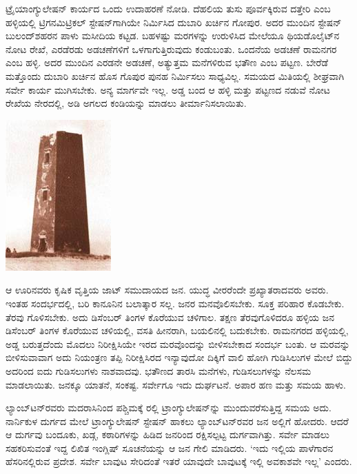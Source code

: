 ಟ್ರೈಯಾಂಗ್ಯುಲೇಷನ್​ ಕಾರ್ಯದ ಒಂದು ಉದಾಹರಣೆ ನೋಡಿ. ದೆಹಲಿಯ ತುಸು ಪೂರ್ವಕ್ಕಿರುವ ದತ್ತೇರಿ ಎಂಬ ಹಳ್ಳಿಯಲ್ಲಿ ಟ್ರಿಗನಮಿಟ್ರಿಕಲ್​ ಸ್ಟೇಷನ್​ಗಾಗಿಯೇ ನಿರ್ಮಿಸಿದ ದುಬಾರಿ ಖರ್ಚಿನ ಗೋಪುರ. ಅದರ ಮುಂದಿನ ಸ್ಟೇಷನ್​ ಬುಲಂದ್​ಶಹರನ ಪಾಳು ಮಸೀದಿಯ ಕಟ್ಟಡ. ಬಹಳಷ್ಟು ಮರಗಳನ್ನು ಉರುಳಿಸಿದ ಮೇಲೆಯೂ ಥಿಯಡೊಲೈಟ್​ನ ನೋಟ ರೇಖೆ, ಎರಡೆರಡು ಅಡಚಣೆಗಳಿಗೆ ಒಳಗಾಗುತ್ತಿರುವುದು ಕಂಡುಬಂತು. ಒಂದನೆಯ ಅಡಚಣೆ ರಾಮನಗರ ಎಂಬ ಹಳ್ಳಿ. ಅದರ ಮುಂದಿನ ಎರಡನೇ ಅಡಚಣೆ, ಅತ್ಯುತ್ತಮ ಮನೆಗಳಿರುವ ಭತೌಣ ಎಂಬ ಪಟ್ಟಣ. ಬೇರೆಡೆ ಮತ್ತೊಂದು ದುಬಾರಿ ಖರ್ಚಿನ ಹೊಸ ಗೊಪುರ ಪುನಹ ನಿರ್ಮಿಸಲು ಸಾಧ್ಯವಿಲ್ಲ. ಸಮಯದ ಮಿತಿಯಲ್ಲಿ ಶೀಘ್ರವಾಗಿ ಸರ್ವೇ ಕಾರ್ಯ ಮುಗಿಸಬೇಕು. ಅನ್ಯ ಮಾರ್ಗವೇ ಇಲ್ಲ. ಅಡ್ಡ ಬಂದ ಆ ಹಳ್ಳಿ ಮತ್ತು ಪಟ್ಟಣದ ನಡುವೆ ನೋಟ ರೇಖೆಯ ನೇರದಲ್ಲಿ,  ಅಡಿ ಅಗಲದ ಕಂಡಿಯನ್ನು ಮಾಡಲು ತೀರ್ಮಾನಿಸಲಾಯಿತು.

\begin{center}
\includegraphics[scale=0.9]{"images/image015.jpg"}
\end{center}

\vskip 4pt

ಆ ಊರಿನವರು ಕೃಷಿಕ ವೃತ್ತಿಯ ಜಾಟ್​ ಸಮುದಾಯದ ಜನ. ಯುದ್ಧ ವೀರರೆಂದೇ ಪ್ರಖ್ಯಾತರಾದವರು ಅವರು. ಇಂತಹ ಸಂದರ್ಭದಲ್ಲಿ, ಬರಿ ಕಾನೂನಿನ ಬಲಾತ್ಕಾರ ಸಲ್ಲ. ಜನರ ಮನವೊಲಿಸಬೇಕು. ಸೂಕ್ತ ಪರಿಹಾರ ಕೊಡಬೇಕು. ತೆರವು ಗೊಳಿಸಬೇಕು. ಅದು ಡಿಸೆಂಬರ್​ ತಿಂಗಳ ಕೊರೆಯುವ ಚಳಿಗಾಲ. ತಕ್ಷಣ ತೆರವುಗೊಳಿದರೂ ಹಳ್ಳಿಯ ಜನ ಡಿಸೆಂಬರ್​ ತಿಂಗಳ ಕೊರೆಯುವ ಚಳಿಯಲ್ಲಿ, ವಸತಿ ಹೀನರಾಗಿ, ಬಯಲಿನಲ್ಲಿ ಬದುಕಬೇಕು. ರಾಮನಗರದ ಹಳ್ಳಿಯಲ್ಲಿ, ಅಡ್ಡ ಬರುತ್ತದೆಂದು ಮೊದಲು ನಿರೀಕ್ಷಿಸಿಯೇ ಇರದ ಮರವೊಂದನ್ನು ಬೀಳಿಸಬೇಕಾದ ಸಂದರ್ಭ ಬಂತು. ಆ ಮರವನ್ನು ಬೀಳಿಸುವಾವಾಗ ಅದು ನಿಯಂತ್ರಣ ತಪ್ಪಿ ನಿರೀಕ್ಷಿಸಿರದ ಇನ್ಯಾವುದೋ ದಿಕ್ಕಿಗೆ ವಾಲಿ ಹೋಗಿ ಗುಡಿಸಿಲುಗಳ ಮೇಲೆ ಬಿದ್ದು ಅದರಿಂದ ಐದು ಗುಡಿಸಲುಗಳು ನಾಶವಾದವು. ಭತೌಣದ  ತಾರಸಿ ಮನೆಗಳು,  ಗುಡಿಸಲುಗಳನ್ನು ನೆಲಸಮ ಮಾಡಲಾಯಿತು. ಜನಕ್ಕೂ ಯಾತನೆ, ಸಂಕಷ್ಟ. ಸರ್ವೇಗೂ ಇದು ದುರ್ಘಟನೆ. ಅಪಾರ ಹಣ ಮತ್ತು ಸಮಯ ಹಾಳು.

\vskip 4pt

ಲ್ಯಾಂಬ್​ಟನ್​ರವರು ಮದರಾಸಿನಿಂದ ಪಶ್ಚಿಮಕ್ಕೆ ರಲ್ಲಿ ಟ್ರಾಂಗ್ಯುಲೇಷನ್​ನ್ನು ಮುಂದುವರೆಸುತ್ತಿದ್ದ ಸಮಯ ಅದು. ನಾರ್ನಿಕುಳ ದುರ್ಗದ ಮೇಲೆ ಟ್ರಾಂಗ್ಯುಲೇಷನ್​ ಸ್ಟೇಷನ್​ ಹಾಕಲು ಲ್ಯಾಂಬ್​ಟನ್​ರವರ ಜನ ಅಲ್ಲಿಗೆ ಹೋದರು. ಆದರೆ ಆ ದುರ್ಗವು ಬಂದೂಕು, ಖಡ್ಗ, ಕಠಾರಿಗಳನ್ನು ಹಿಡಿದ ಜನರಿಂದ ರಕ್ಷಿಸಲ್ಪಟ್ಟ ದುರ್ಗವಾಗಿತ್ತು. ಸರ್ವೇ ಮಾಡಲು ಸಹಕರಿಸುವಂತೆ ಇದ್ದ ಲಿಖಿತ ಇಂಗ್ಲಿಷ್​ ಸೂಚನೆಯನ್ನು ಆ ಜನ ಗೇಲಿ ಮಾಡಿದರು. ‘ಇದು ಇಲ್ಲಿಯ ಪಾಳೆಗಾರನ ಹೆಸರಿನಲ್ಲಿರುವ ಪ್ರದೇಶ. ಸರ್ವೇ ಬಾವುಟ ಸೇರಿದಂತೆ ಇತರೆ ಯಾವುದೇ ಬಾವುಟಕ್ಕೆ ಇಲ್ಲಿ ಅವಕಾಶವೇ ಇಲ್ಲ’ ಎಂದರು.

